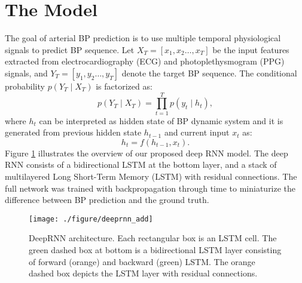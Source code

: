 \documentclass[letterpaper, 10 pt, conference]{ieeeconf}
\begin{document}
\section{The Model}
The goal of arterial BP prediction is to use multiple temporal physiological signals to predict BP sequence.
Let $ X_T = [ x_1, x_{2} \dots , x_{T}] $ be the input features extracted from electrocardiography (ECG) and photoplethysmogram (PPG) signals, and $ Y_T =  [y_1, y_{2} \dots , y_{T}] $ denote the target BP sequence.
The conditional probability $ p( Y_T \mid  X_T ) $ is factorized as: 
\begin{equation} \label{eq:1}
p( Y_T \mid  X_T ) = \prod_{t =1}^T p(y_{t}\mid h_t),
\end{equation}
where $ h_t $ can be interpreted as hidden state of BP dynamic system and it is generated from previous hidden state $ h_{t-1} $ and current input $ x_t $ as:
\begin{equation} \label{eq:2}
h_t = f(h_{t-1}, x_t).
\end{equation}
Figure \ref{fig:deeprnn} illustrates the overview of our proposed deep RNN model.
The deep RNN consists of a bidirectional LSTM at the bottom layer, and a stack of multilayered Long Short-Term Memory (LSTM) with residual connections.
The full network was trained with backpropagation through time \cite{werbos1990backpropagation}  to miniaturize the difference between BP prediction and the ground truth.
\begin{figure}
\centering
\texttt{[image: ./figure/deeprnn\_add]}
\caption{DeepRNN architecture. Each rectangular box is an LSTM cell.
The green dashed box at bottom is a bidirectional LSTM layer consisting of forward (orange) and backward (green) LSTM.
The orange dashed box depicts the LSTM layer with residual connections.}
\label{fig:deeprnn}
\end{figure}
\end{document}
